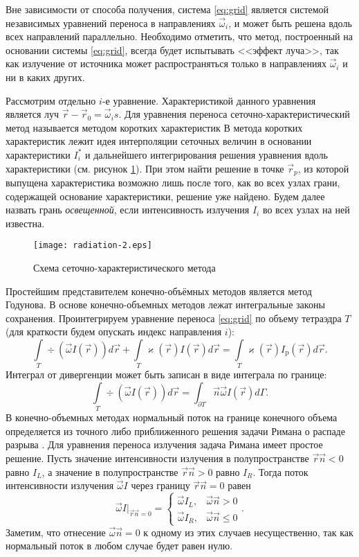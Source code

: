 Вне зависимости от способа получения, система \eqref{eq:grid} является системой независимых уравнений переноса в направлениях $\vec \omega_i$, и может быть решена вдоль всех направлений параллельно. Необходимо отметить, что метод, построенный на основании системы \eqref{eq:grid}, всегда будет испытывать <<эффект луча>>, так как излучение от источника может распространяться только в направлениях $\vec \omega_i$ и ни в каких других.



Рассмотрим отдельно $i$-е уравнение. Характеристикой данного уравнения является луч $\vec r - \vec r_0 = \vec \omega_i s$. 
Для уравнения переноса сеточно-характеристический метод называется методом коротких характеристик В метода коротких характеристик лежит идея интерполяции сеточных величин в основании характеристики $I_i^*$ и дальнейшего интегрирования решения уравнения вдоль характеристики (см. рисунок \ref{fig:char}). При этом найти решение в точке $\vec r_p$, из которой выпущена характеристика возможно лишь после того, как во всех узлах грани, содержащей основание характеристики, решение уже найдено. Будем далее назвать грань \emph{освещенной}, если интенсивность излучения $I_i$ во всех узлах на ней известна.
\begin{figure}[ht!]
\centering
\texttt{[image: radiation-2.eps]}
\caption{Схема сеточно-характеристического метода}
\label{fig:char}
\end{figure}

Простейшим представителем конечно-объёмных методов является метод Годунова. В основе конечно-объемных методов лежат интегральные законы сохранения. Проинтегрируем уравнение переноса
\eqref{eq:grid} по объему тетраэдра $T$ (для краткости будем опускать индекс направления $i$):
\[
\int\limits_T \div (\vec \omega I(\vec r))  d\vec r + \int\limits_T \varkappa(\vec r) I(\vec r)  d\vec r = \int\limits_T \varkappa(\vec r) I_\text{p}(\vec r)  d\vec r.
\]
Интеграл от дивергенции может быть записан в виде интеграла по границе:
\[
\int\limits_T \div (\vec \omega I(\vec r)) d\vec r= \int_{\partial T} \vec n \vec \omega I(\vec r) d\Gamma.
\]
В конечно-объемных методах нормальный поток на границе конечного объема определяется из точного либо приближенного решения задачи Римана о распаде разрыва \cite{Kulikovskiy2001}.
Для уравнения переноса излучения задача Римана имеет простое решение. Пусть значение интенсивности излучения в полупространстве $\vec r \vec n < 0$ равно $I_L$, а значение в полупространстве $\vec r \vec n > 0$ равно $I_R$. Тогда поток интенсивности излучения $\vec \omega I$ через границу $\vec r \vec n = 0$ равен
\[
\vec \omega I\big|_{\vec r \vec n = 0} = 
\begin{cases}
\vec \omega I_L, &\vec \omega \vec n > 0\\
\vec \omega I_R, &\vec \omega \vec n \leq 0
\end{cases}.
\] 
Заметим, что отнесение $\vec \omega \vec n = 0$ к одному из этих случаев несущественно, так как нормальный поток в любом случае будет равен нулю.

